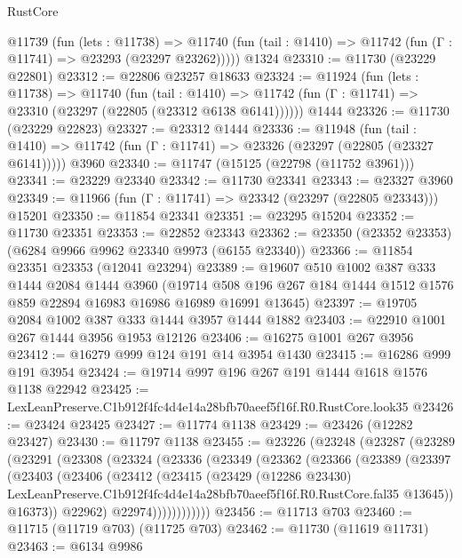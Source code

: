 \begin{lexlean}{RustCore}
\begin{coremodule}
    @11739
      (fun (lets : @11738) =>
      @11740 (fun (tail : @1410) => @11742 (fun (Γ : @11741) => @23293 (@23297 @23262)))))
    @1324
@23310 := @11730 (@23229 @22801)
@23312 := @22806 @23257 @18633
@23324 := @11924
    (fun (lets : @11738) =>
    @11740
      (fun (tail : @1410) =>
      @11742 (fun (Γ : @11741) => @23310 (@23297 (@22805 (@23312 @6138 @6141))))))
    @1444
@23326 := @11730 (@23229 @22823)
@23327 := @23312 @1444
@23336 := @11948
    (fun (tail : @1410) => @11742 (fun (Γ : @11741) => @23326 (@23297 (@22805 (@23327 @6141)))))
    @3960
@23340 := @11747 (@15125 (@22798 (@11752 @3961)))
@23341 := @23229 @23340
@23342 := @11730 @23341
@23343 := @23327 @3960
@23349 := @11966 (fun (Γ : @11741) => @23342 (@23297 (@22805 @23343))) @15201
@23350 := @11854 @23341
@23351 := @23295 @15204
@23352 := @11730 @23351
@23353 := @22852 @23343
@23362 := @23350 (@23352 @23353) (@6284 @9966 @9962 @23340 @9973 (@6155 @23340))
@23366 := @11854 @23351 @23353 (@12041 @23294)
@23389 := @19607
    @510
    @1002
    @387
    @333
    @1444
    @2084
    @1444
    @3960
    (@19714 @508 @196 @267 @184 @1444 @1512 @1576 @859 @22894 @16983 @16986 @16989 @16991 @13645)
@23397 := @19705 @2084 @1002 @387 @333 @1444 @3957 @1444 @1882
@23403 := @22910 @1001 @267 @1444 @3956 @1953 @12126
@23406 := @16275 @1001 @267 @3956
@23412 := @16279 @999 @124 @191 @14 @3954 @1430
@23415 := @16286 @999 @191 @3954
@23424 := @19714 @997 @196 @267 @191 @1444 @1618 @1576 @1138 @22942
@23425 := LexLeanPreserve.C1b912f4fc4d4e14a28bfb70aeef5f16f.R0.RustCore.look35
@23426 := @23424 @23425
@23427 := @11774 @1138
@23429 := @23426 (@12282 @23427)
@23430 := @11797 @1138
@23455 := @23226
    (@23248
      (@23287
        (@23289
          (@23291
            (@23308
              (@23324
                (@23336
                  (@23349
                    (@23362
                      (@23366
                        (@23389
                          (@23397
                            (@23403
                              (@23406
                                (@23412
                                  (@23415
                                    (@23429
                                      (@12286 @23430)
                                      LexLeanPreserve.C1b912f4fc4d4e14a28bfb70aeef5f16f.R0.RustCore.fal35
                                      @13645))
                                  @16373))
                              @22962)
                            @22974))))))))))))
@23456 := @11713 @703
@23460 := @11715 (@11719 @703) (@11725 @703)
@23462 := @11730 (@11619 @11731)
@23463 := @6134 @9986

\end{coremodule}
\end{lexlean}
